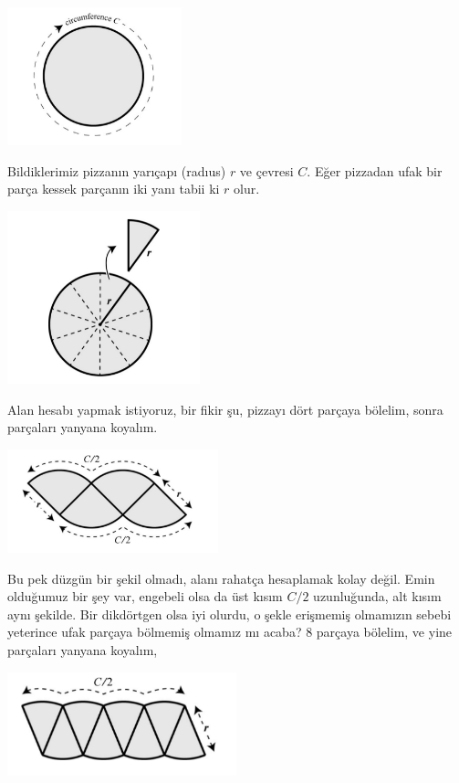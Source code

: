 \documentclass[12pt,fleqn]{article}\usepackage{../../common}
\begin{document}
\includegraphics[height=4cm]{circ_1.png}

Bildiklerimiz pizzanın yarıçapı (radıus) $r$ ve çevresi $C$. Eğer pizzadan
ufak bir parça kessek parçanın iki yanı tabii ki $r$ olur.

\includegraphics[height=5cm]{circ_2.png}

Alan hesabı yapmak istiyoruz, bir fikir şu, pizzayı dört parçaya bölelim,
sonra parçaları yanyana koyalım.

\includegraphics[height=3cm]{circ_3.png}

Bu pek düzgün bir şekil olmadı, alanı rahatça hesaplamak kolay değil. Emin
olduğumuz bir şey var, engebeli olsa da üst kısım $C/2$ uzunluğunda, alt
kısım aynı şekilde. Bir dikdörtgen olsa iyi olurdu, o şekle erişmemiş
olmamızın sebebi yeterince ufak parçaya bölmemiş olmamız mı acaba? 8
parçaya bölelim, ve yine parçaları yanyana koyalım,

\includegraphics[height=3cm]{circ_4.png}
\end{document}
